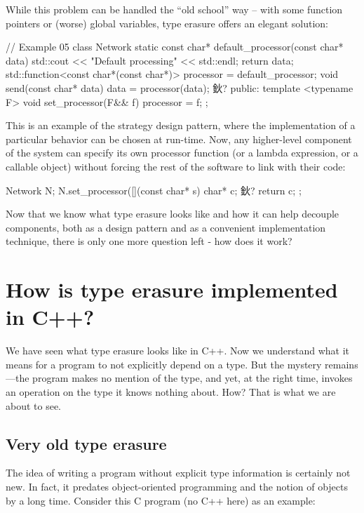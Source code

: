 While this problem can be handled the ``old school'' way -- with some function pointers or (worse) global variables, type erasure offers an elegant solution:

\begin{code}
// Example 05
class Network {
  static const char* default_processor(const char* data) {
    std::cout << "Default processing" << std::endl;
    return data;
  }
  std::function<const char*(const char*)> processor =
    default_processor;
  void send(const char* data) {
    data = processor(data);
    鈥?
  }
  public:
  template <typename F>
  void set_processor(F&& f) { processor = f; }
};
\end{code}

This is an example of the strategy design pattern, where the implementation of a particular behavior can be chosen at run-time. Now, any higher-level component of the system can specify its own processor function (or a lambda expression, or a callable object) without forcing the rest of the software to link with their code:

\begin{code}
Network N;
N.set_processor([](const char* s){ char* c; 鈥? return c; };
\end{code}

Now that we know what type erasure looks like and how it can help decouple components, both as a design pattern and as a convenient implementation technique, there is only one more question left - how does it work?

\section{How is type erasure implemented in C++?}

We have seen what type erasure looks like in C++. Now we understand what it means for a program to not explicitly depend on a type. But the mystery remains---the program makes no mention of the type, and yet, at the right time, invokes an operation on the type it knows nothing about. How? That is what we are about to see.

\subsection{Very old type erasure}

The idea of writing a program without explicit type information is certainly not new. In fact, it predates object-oriented programming and the notion of objects by a long time. Consider this C program (no C++ here) as an example:


